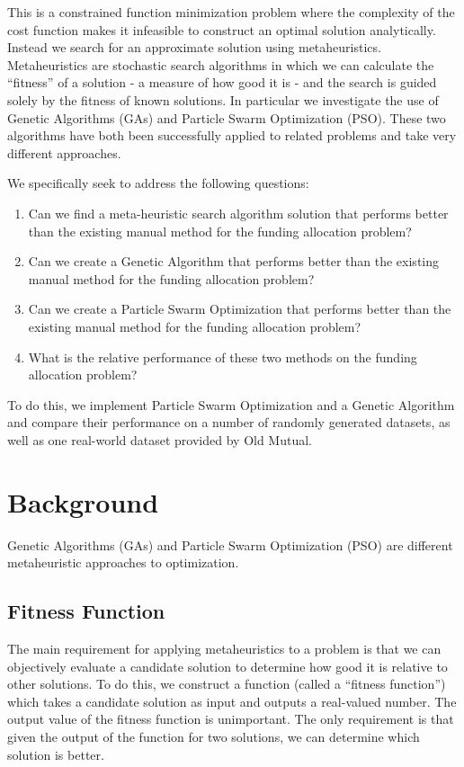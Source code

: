 \documentclass{sig-alternate}
\begin{document}
This is a constrained function minimization problem where the complexity of the cost function makes it infeasible to construct an optimal solution analytically. Instead we search for an approximate solution using metaheuristics. Metaheuristics are stochastic search algorithms in which we can calculate the ``fitness'' of a solution - a measure of how good it is - and the search is guided solely by the fitness of known solutions.
In particular we investigate the use of Genetic Algorithms (GAs) and Particle Swarm Optimization (PSO). These two algorithms have both been successfully applied to related problems\cite{Mendes2008, Poli2008, Potvin1996, Roth1994} and take very different approaches.

We specifically seek to address the following questions:
\begin{enumerate}
	\item Can we find a meta-heuristic search algorithm solution that performs better than the existing manual method for the funding allocation problem?
	\item Can we create a Genetic Algorithm that performs better than the existing manual method for the funding allocation problem?
	\item Can we create a Particle Swarm Optimization that performs better than the existing manual method for the funding allocation problem?
	\item What is the relative performance of these two methods on the funding allocation problem?
\end{enumerate}
To do this, we implement Particle Swarm Optimization and a Genetic Algorithm and compare their performance on a number of randomly generated datasets, as well as one real-world dataset provided by Old Mutual.

\section{Background}\label{sec:background}
Genetic Algorithms (GAs) and Particle Swarm Optimization (PSO) are different metaheuristic approaches to optimization.

\subsection{Fitness Function}
The main requirement for applying metaheuristics to a problem is that we can objectively evaluate a candidate solution to determine how good it is relative to other solutions. To do this, we construct a function (called a ``fitness function'') which takes a candidate solution as input and outputs a real-valued number. The output value of the fitness function is unimportant. The only requirement is that given the output of the function for two solutions, we can determine which solution is better.
\end{document}
